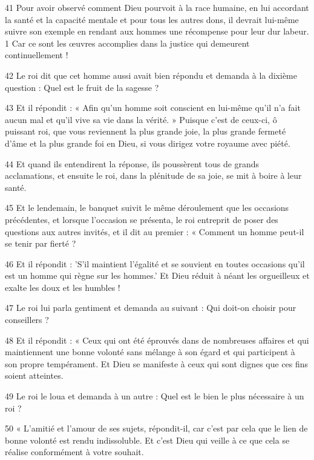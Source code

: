 \par 41 Pour avoir observé comment Dieu pourvoit à la race humaine, en lui accordant la santé et la capacité mentale et pour tous les autres dons, il devrait lui-même suivre son exemple en rendant aux hommes une récompense pour leur dur labeur. 1 Car ce sont les œuvres accomplies dans la justice qui demeurent continuellement !

\par 42 Le roi dit que cet homme aussi avait bien répondu et demanda à la dixième question : Quel est le fruit de la sagesse ?

\par 43 Et il répondit : « Afin qu'un homme soit conscient en lui-même qu'il n'a fait aucun mal et qu'il vive sa vie dans la vérité. » Puisque c'est de ceux-ci, ô puissant roi, que vous reviennent la plus grande joie, la plus grande fermeté d'âme et la plus grande foi en Dieu, si vous dirigez votre royaume avec piété.

\par 44 Et quand ils entendirent la réponse, ils poussèrent tous de grands acclamations, et ensuite le roi, dans la plénitude de sa joie, se mit à boire à leur santé.

\par 45 Et le lendemain, le banquet suivit le même déroulement que les occasions précédentes, et lorsque l'occasion se présenta, le roi entreprit de poser des questions aux autres invités, et il dit au premier : « Comment un homme peut-il se tenir par fierté ?

\par 46 Et il répondit : 'S'il maintient l'égalité et se souvient en toutes occasions qu'il est un homme qui règne sur les hommes.' Et Dieu réduit à néant les orgueilleux et exalte les doux et les humbles !

\par 47 Le roi lui parla gentiment et demanda au suivant : Qui doit-on choisir pour conseillers ?

\par 48 Et il répondit : « Ceux qui ont été éprouvés dans de nombreuses affaires et qui maintiennent une bonne volonté sans mélange à son égard et qui participent à son propre tempérament. Et Dieu se manifeste à ceux qui sont dignes que ces fins soient atteintes.

\par 49 Le roi le loua et demanda à un autre : Quel est le bien le plus nécessaire à un roi ?

\par 50 « L'amitié et l'amour de ses sujets, répondit-il, car c'est par cela que le lien de bonne volonté est rendu indissoluble. Et c'est Dieu qui veille à ce que cela se réalise conformément à votre souhait.

